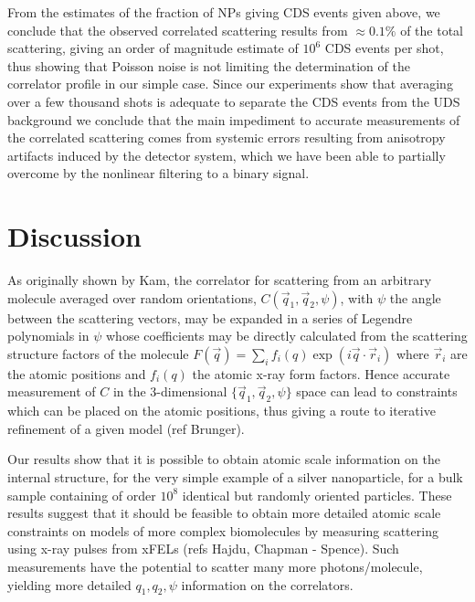\documentclass [11pt,fleqn]{article}
\begin{document}
From the estimates of the fraction of NPs giving CDS events given above, we conclude that the observed correlated scattering results from $\approx 0.1\%$ of the total scattering, giving an order of magnitude estimate of  $10^6$ CDS events per shot, thus showing that Poisson noise is not limiting the determination of the correlator profile in our simple case. Since our experiments show that averaging over a few thousand shots is adequate to separate the CDS events from the UDS background we conclude that the main impediment to accurate measurements of the correlated scattering comes from systemic errors resulting from  anisotropy artifacts induced by  the detector system, which we have been able to partially overcome by the nonlinear filtering to a binary signal. 

\section{Discussion}
As originally shown by Kam, the correlator for scattering from an arbitrary molecule averaged over random orientations, $C(\vec{q}_1,\vec{q}_2,\psi)$, with $\psi$ the angle between the scattering vectors, may be expanded in a series of Legendre polynomials  in $\psi$ whose coefficients may be directly calculated from the scattering structure factors of the molecule $F(\vec {q})=\sum_i f_i(q) \exp(i\vec {q}\cdot\vec {r}_i)$ where $\vec {r}_i$ are the atomic positions and $f_i(q)$ the atomic x-ray form factors. Hence accurate measurement of $C$ in the 3-dimensional $\{\vec{q}_1,\vec{q}_2,\psi\}$ space can lead to constraints which can be placed on the atomic positions, thus giving a route to iterative refinement of a given model (ref Brunger). 

Our results show that it is possible to obtain atomic scale information on the internal structure, for the very simple example  of a silver nanoparticle, for a bulk sample containing of order $10^8$ identical but randomly oriented particles. These results suggest that it should be feasible to obtain more detailed atomic scale constraints on models  of more complex biomolecules by measuring scattering using x-ray pulses from xFELs (refs Hajdu, Chapman - Spence). Such measurements have the potential to scatter many more photons/molecule, yielding more detailed $q_1,q_2,\psi$ information on the correlators. 
\end{document}
